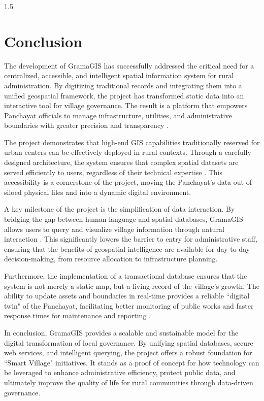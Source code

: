 \newpage
{}
\thispagestyle{empty}
%
\begin{spacing}{1.5}
%
\chapter{Conclusion}

The development of GramaGIS has successfully addressed the critical need for a centralized, accessible, and intelligent spatial information system for rural administration. By digitizing traditional records and integrating them into a unified geospatial framework, the project has transformed static data into an interactive tool for village governance. The result is a platform that empowers Panchayat officials to manage infrastructure, utilities, and administrative boundaries with greater precision and transparency \cite{smart_panchayat2023}.

The project demonstrates that high-end GIS capabilities traditionally reserved for urban centers can be effectively deployed in rural contexts. Through a carefully designed architecture, the system ensures that complex spatial datasets are served efficiently to users, regardless of their technical expertise \cite{fu2020webgis}. This accessibility is a cornerstone of the project, moving the Panchayat's data out of siloed physical files and into a dynamic digital environment.

A key milestone of the project is the simplification of data interaction. By bridging the gap between human language and spatial databases, GramaGIS allows users to query and visualize village information through natural interaction \cite{liu2025nalspatial}. This significantly lowers the barrier to entry for administrative staff, ensuring that the benefits of geospatial intelligence are available for day-to-day decision-making, from resource allocation to infrastructure planning.



Furthermore, the implementation of a transactional database ensures that the system is not merely a static map, but a living record of the village’s growth. The ability to update assets and boundaries in real-time provides a reliable ``digital twin" of the Panchayat, facilitating better monitoring of public works and faster response times for maintenance and reporting \cite{postgis_in_action}.

In conclusion, GramaGIS provides a scalable and sustainable model for the digital transformation of local governance. By unifying spatial databases, secure web services, and intelligent querying, the project offers a robust foundation for ``Smart Village" initiatives. It stands as a proof of concept for how technology can be leveraged to enhance administrative efficiency, protect public data, and ultimately improve the quality of life for rural communities through data-driven governance.

\end{spacing}